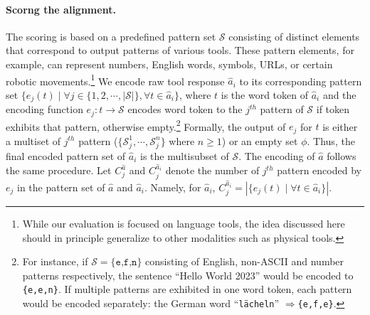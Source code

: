 \documentclass[11pt]{article}
\newcommand{\danielchange}[2]{{\color{red}{\st{#1}}{#2}}}
\begin{document}
\paragraph{Scorng the alignment.}
The scoring is based on a predefined pattern set $\mathcal{S}$ consisting of distinct elements that correspond to output patterns of various tools. 
These pattern elements, for example, can represent numbers, English words, symbols, URLs, or certain robotic movements.\footnote{While our evaluation is focused on language tools, the idea discussed here should in principle generalize to other modalities such as physical tools.}
We encode raw tool response $\hat{a}_i$ to its corresponding pattern set $\{e_j(t) \mid \forall j\in \{1,2,\cdots,|\mathcal{S}|\}, \forall t\in \hat{a}_i\}$, where $t$ is the word token of $\hat{a}_i$ and the encoding function $e_j:t\rightarrow \mathcal{S}$ encodes word token to the $j^{th}$ pattern of $\mathcal{S}$ if token exhibits that pattern, otherwise empty.\footnote{For instance, if $\mathcal{S}=\texttt{\{e,f,n\}}$ consisting of English, non-ASCII and number patterns respectively, the sentence ``Hello World 2023'' would be encoded to \texttt{\{e,e,n\}}. If multiple patterns are exhibited in one word token, each pattern would be encoded separately: the German word ``\texttt{lächeln}'' $\Longrightarrow$\texttt{\{e,f,e\}}.} Formally, the output of $e_j$ for $t$ is either a multiset of $j^{th}$ pattern ($\{\mathcal{S}_j^{1},\cdots,\mathcal{S}_j^{n}\}$ where $n\geq 1$) or an empty set $\phi$. Thus, the final encoded pattern set of $\hat{a}_i$ is the multisubset of $\mathcal{S}$. The encoding of $\hat{a}$ follows the same procedure. Let $C_j^{\hat{a}}$ and $C_j^{\hat{a}_i}$ denote the number of $j^{th}$ pattern encoded by $e_j$ in the pattern set of $\hat{a}$ and $\hat{a}_i$. Namely, for $\hat{a}_i$, $C_j^{\hat{a}_i}=|\{e_j(t)\mid \forall t\in \hat{a}_i\}|$. 
\end{document}
